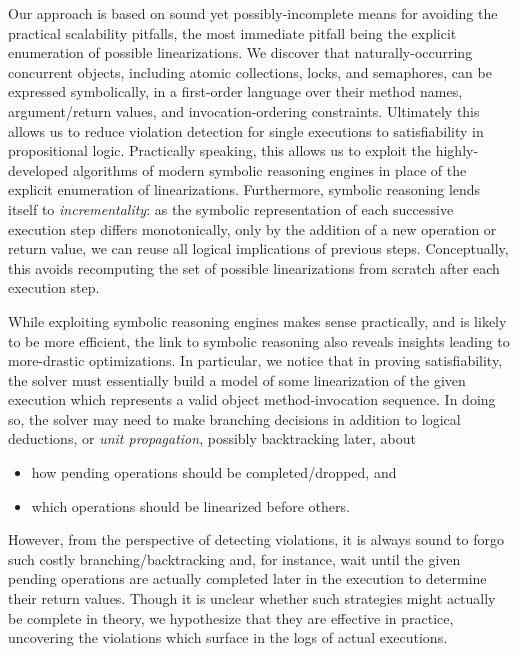 Our approach is based on sound yet possibly-incomplete means for avoiding the
practical scalability pitfalls, the most immediate pitfall being the explicit
enumeration of possible linearizations. We discover that naturally-occurring
concurrent objects, including atomic collections, locks, and semaphores, can be
expressed symbolically, in a first-order language over their method names,
argument/return values, and invocation-ordering constraints. Ultimately this
allows us to reduce violation detection for single executions to satisfiability
in propositional logic. Practically speaking, this allows us to exploit the
highly-developed algorithms of modern symbolic reasoning engines in place of
the explicit enumeration of linearizations. Furthermore, symbolic reasoning
lends itself to \emph{incrementality}: as the symbolic representation of each
successive execution step differs monotonically, only by the addition of a new
operation or return value, we can reuse all logical implications of previous
steps. Conceptually, this avoids recomputing the set of possible linearizations
from scratch after each execution step.

While exploiting symbolic reasoning engines makes sense practically, and is
likely to be more efficient, the link to symbolic reasoning also reveals
insights leading to more-drastic optimizations. In particular, we notice that
in proving satisfiability, the solver must essentially build a model of some
linearization of the given execution which represents a valid object
method-invocation sequence. In doing so, the solver may need to make branching
decisions in addition to logical deductions, or \emph{unit propagation},
possibly backtracking later, about
\begin{itemize}

  \item how pending operations should be completed/dropped, and

  \item which operations should be linearized before others.

\end{itemize}
However, from the perspective of detecting violations, it is always sound to
forgo such costly branching/backtracking and, for instance, wait until the
given pending operations are actually completed later in the execution to
determine their return values. Though it is unclear whether such strategies
might actually be complete in theory, we hypothesize that they are effective in
practice, uncovering the violations which surface in the logs of actual
executions.

